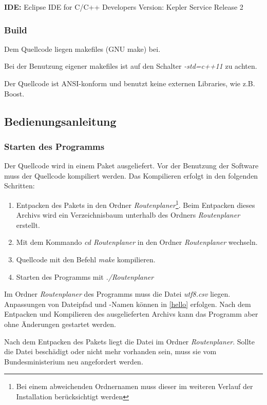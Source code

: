 \documentclass[12pt, a4paper, ngerman]{article}
\begin{document}
\textbf{IDE:}\newline
Eclipse IDE for C/C++ Developers \newline
Version: Kepler Service Release 2

\subsubsection{Build}
Dem Quellcode liegen makefiles (GNU make) bei.

Bei der Benutzung eigener makefiles ist auf den Schalter \textit{-std=c++11} zu achten. 

Der Quellcode ist ANSI-konform und benutzt keine externen Libraries, wie z.B. Boost.

\subsection{Bedienungsanleitung \label{Bedienungsanleitung}}
\subsubsection{Starten des Programms}
Der Quellcode wird in einem Paket ausgeliefert. Vor der Benutzung der Software muss der Quellcode kompiliert werden. Das Kompilieren erfolgt in den folgenden Schritten:
\begin{enumerate}
	\item Entpacken des Pakets in den Ordner \textit{Routenplaner}\footnote{Bei einem abweichenden Ordnernamen muss dieser im weiteren Verlauf der Installation berücksichtigt werden}. Beim Entpacken dieses Archivs wird ein Verzeichnisbaum unterhalb des Ordners \textit{Routenplaner} erstellt.
	\item Mit dem Kommando \textit{cd Routenplaner} in den Ordner \textit{Routenplaner} wechseln.
	\item Quellcode mit den Befehl \textit{make} kompilieren.
	\item Starten des Programms mit \textit{./Routenplaner}
\end{enumerate}

Im Ordner \textit{Routenplaner} des Programms muss die Datei \textit{utf8.csv} liegen. Anpassungen von Dateipfad und -Namen können in \ref{hello} erfolgen. Nach dem Entpacken und Kompilieren des ausgelieferten Archivs kann das Programm aber ohne Änderungen gestartet werden.

Nach dem Entpacken des Pakets liegt die Datei im Ordner \textit{Routenplaner}. Sollte die Datei beschädigt oder nicht mehr vorhanden sein, muss sie vom Bundesministerium neu angefordert werden. 
\end{document}
